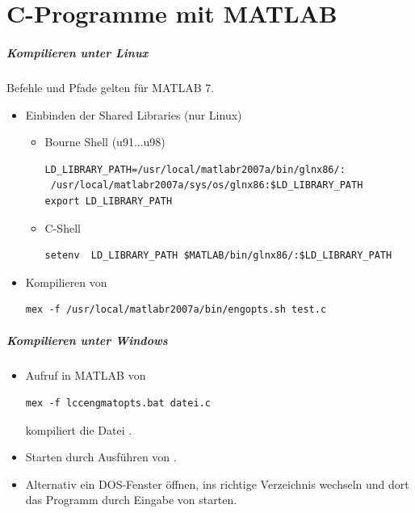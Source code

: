 \part{C-Programme mit MATLAB}
%
%
\begin{frame}[fragile]\frametitle{Kompilieren unter Linux}

Befehle und Pfade gelten f\"ur MATLAB 7.

\begin{itemize}
\item Einbinden der Shared Libraries (nur Linux)
\begin{itemize}
\item Bourne Shell (u91...u98)
\begin{lstlisting}
LD_LIBRARY_PATH=/usr/local/matlabr2007a/bin/glnx86/:
 /usr/local/matlabr2007a/sys/os/glnx86:$LD_LIBRARY_PATH
export LD_LIBRARY_PATH
\end{lstlisting} %
\item C-Shell
\begin{lstlisting}
setenv  LD_LIBRARY_PATH $MATLAB/bin/glnx86/:$LD_LIBRARY_PATH
\end{lstlisting}
\end{itemize}
\item Kompilieren von 
\begin{lstlisting}
mex -f /usr/local/matlabr2007a/bin/engopts.sh test.c
\end{lstlisting}
\end{itemize}
\end{frame}
% 
% 
\begin{frame}[fragile]\frametitle{Kompilieren unter Windows}
\begin{itemize}
\item Aufruf in MATLAB von
\begin{lstlisting}
mex -f lccengmatopts.bat datei.c
\end{lstlisting}
kompiliert die Datei .
\item Starten durch Ausf\"uhren von .
\item Alternativ ein DOS-Fenster \"offnen, ins richtige Verzeichnis wechseln  
 und dort das Programm durch Eingabe von  starten.
\end{itemize}
\end{frame}
% 
% 
